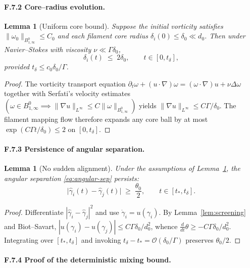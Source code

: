 \documentclass[11pt]{article}
\newtheorem{lemma}[theorem]{Lemma}
\theoremstyle{definition}
\theoremstyle{remark}
\newcommand{\nuvisc}{\nu}
\begin{document}
\paragraph{F.7.2  Core–radius evolution.}

\begin{lemma}[Uniform core bound]\label{lem:core-bound}
Suppose the initial vorticity satisfies
$\|\omega_0\|_{B_{1,\infty}^{0}}\le C_0$ and each filament core radius
$\delta_i(0)\le\delta_0\ll d_0$.
Then under Navier–Stokes with viscosity $\nuvisc\ll\Gamma\delta_0$,
\[
\delta_i(t)\;\le\;2\delta_0,
\qquad
t\in[0,t_\delta],
\tag{F.23}\label{eq:core-growth}
\]
provided $t_\delta\le c_0\delta_0/\Gamma$.
\end{lemma}

\begin{proof}
The vorticity transport equation
$\partial_t\omega+(u\!\cdot\!\nabla)\omega=(\omega\!\cdot\!\nabla)u+\nuvisc\Delta\omega$
together with Serfati’s velocity estimates
$(\omega\in B_{1,\infty}^{0}\!\implies\!\|\nabla u\|_{L^\infty}\!\le\!C\|\omega\|_{B_{1,\infty}^{0}})$
yields $\|\nabla u\|_{L^\infty}\le C\Gamma/\delta_0$.
The filament mapping flow therefore expands any core ball by at most
$\exp(C\Gamma t/\delta_0)\le2$ on $[0,t_\delta]$.
\end{proof}

\paragraph{F.7.3  Persistence of angular separation.}

\begin{lemma}[No sudden alignment]\label{lem:alignment}
Under the assumptions of Lemma~\ref{lem:core-bound},
the angular separation \eqref{eq:angular-sep} persists:
\[
\bigl|\widehat\gamma_i(t)\!-\!\widehat\gamma_j(t)\bigr|
\;\ge\;
\frac{\theta_0}{2},
\qquad
t\in[t_*,t_\delta].
\]
\end{lemma}

\begin{proof}
Differentiate $|\widehat\gamma_i-\widehat\gamma_j|^{2}$
and use $\dot\gamma_i=u(\gamma_i)$.
By Lemma~\ref{lem:screening} and Biot–Savart,
$|u(\gamma_i)-u(\gamma_j)|\le C\Gamma\delta_0/d_0^{2}$,
whence $\frac{d}{dt}\theta\ge-C\Gamma\delta_0/d_0^{2}$.
Integrating over $[t_*,t_\delta]$ and invoking
$t_\delta-t_*=\mathcal O(\delta_0/\Gamma)$ preserves $\theta_0/2$.
\end{proof}


\paragraph{F.7.4  Proof of the deterministic mixing bound.}
\end{document}
